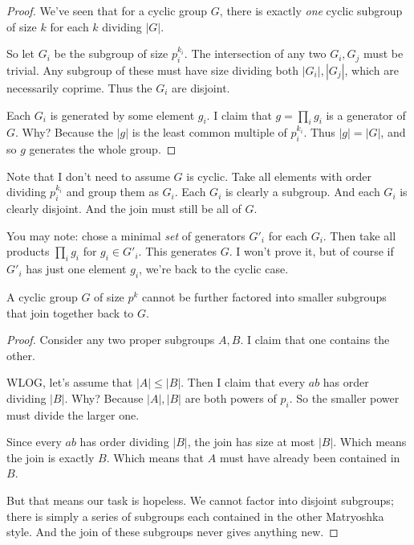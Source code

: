 \begin{proof}
  We've seen that for a cyclic group $G$, there is exactly \emph{one}
  cyclic subgroup of size $k$ for each $k$ dividing $|G|$.

  So let $G_i$ be the subgroup of size $p_i^{k_i}$. The intersection of
  any two $G_i, G_j$ must be trivial. Any subgroup of these must have
  size dividing both $|G_i|, |G_j|$, which are necessarily coprime. Thus
  the $G_i$ are disjoint.

  Each $G_i$ is generated by some element $g_i$. I claim that $g =
  \prod_i g_i$ is a generator of $G$. Why? Because the $|g|$ is the
  least common multiple of $p_i^{k_i}$. Thus $|g| = |G|$, and so $g$
  generates the whole group.
\end{proof}

\begin{remark}
  Note that I don't need to assume $G$ is cyclic. Take all elements with
  order dividing $p_i^{k_i}$ and group them as $G_i$. Each $G_i$ is
  clearly a subgroup. And each $G_i$ is clearly disjoint. And the join
  must still be all of $G$.

  You may note: chose a minimal \emph{set} of generators $G'_i$ for each
  $G_i$. Then take all products $\prod_i g_i$ for $g_i \in G'_i$. This
  generates $G$. I won't prove it, but of course if $G'_i$ has just one
  element $g_i$, we're back to the cyclic case.
\end{remark}

\begin{theorem}
  A cyclic group $G$ of size $p^k$ cannot be further factored into
  smaller subgroups that join together back to $G$.
\end{theorem}

\begin{proof}
  Consider any two proper subgroups $A, B$. I claim that one contains
  the other.

  WLOG, let's assume that $|A| \leq |B|$. Then I claim that every $ab$
  has order dividing $|B|$. Why? Because $|A|, |B|$ are both powers of
  $p_i$. So the smaller power must divide the larger one.

  Since every $ab$ has order dividing $|B|$, the join has size at most
  $|B|$. Which means the join is exactly $B$. Which means that $A$ must
  have already been contained in $B$.

  But that means our task is hopeless. We cannot factor into disjoint
  subgroups; there is simply a series of subgroups each contained in the
  other Matryoshka style. And the join of these subgroups never gives
  anything new.
\end{proof}

